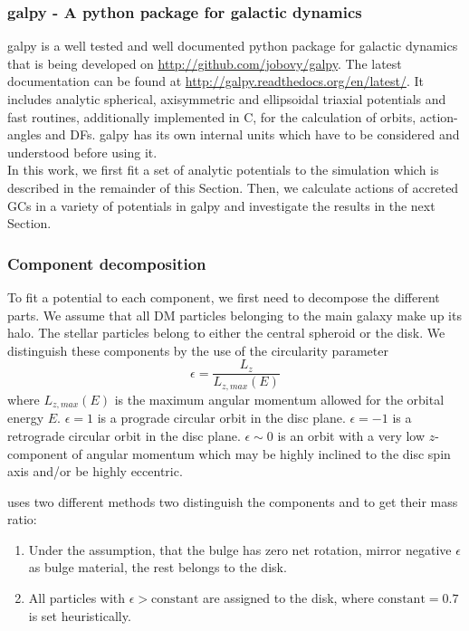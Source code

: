 \subsubsection{galpy - A python package for galactic dynamics}\label{subsubsec:galpy}
galpy \citep{Bovy...galpy...2015} is a well tested and well documented python package for galactic dynamics that is being developed on \url{http://github.com/jobovy/galpy}. The latest documentation can be found at \url{http://galpy.readthedocs.org/en/latest/}. It includes analytic spherical, axisymmetric and ellipsoidal triaxial potentials and fast routines, additionally implemented in C, for the calculation of orbits, action-angles and \acp{DF}. galpy has its own internal units which have to be considered and understood before using it.
\\In this work, we first fit a set of analytic potentials to the simulation which is described in the remainder of this Section. Then, we calculate actions of accreted \acp{GC} in a variety of potentials in galpy and investigate the results in the next Section. 

\subsubsection{Component decomposition}\label{subsubsec:decomp}
To fit a potential to each component, we first need to decompose the different parts. We assume that all \ac{DM} particles belonging to the main galaxy make up its halo. The stellar particles belong to either the central spheroid or the disk. We distinguish these components by the use of the circularity parameter \citep{Abadi...circularity...2003}
\begin{equation}\label{eq:circularity}
    \epsilon = \frac{L_z}{L_{z,max}(E)}
\end{equation}
where $L_{z,max}(E)$ is the maximum angular momentum allowed for the orbital energy $E$. 
$\epsilon = 1$ is a prograde circular orbit in the disc plane. $\epsilon = -1$ is a retrograde circular orbit in the disc plane. $\epsilon \sim 0$ is an orbit with a very low $z$-component of angular momentum which may be highly inclined to the disc spin axis and/or be highly eccentric.  

\cite{AurigaGrand} uses two different methods two distinguish the components and to get their mass ratio:
\begin{enumerate}
\item Under the assumption, that the bulge has zero net rotation, mirror negative $\epsilon$ as bulge material, the rest belongs to the disk.
\item All particles with $\epsilon > \mathrm{constant}$ are assigned to the disk, where $\mathrm{constant} = 0.7$ is set heuristically.
\end{enumerate}

